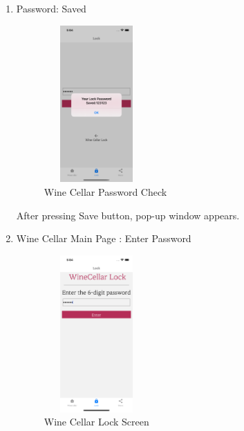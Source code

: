 \documentclass[sigconf, nonacm]{acmart}
\begin{document}
\begin {enumerate}
\begin{enumerate}
\begin{enumerate}
\begin{enumerate}
                \item Password: Saved\\
                \begin{figure}
                    \centering          
                    \includegraphics[width=4cm, height=6cm]{3. Winecellar AfterSetPasswd.png}
                    \caption{Wine Cellar Password Check}
                \end{figure}
                After pressing Save button, pop-up window appears. 
                 
                \item Wine Cellar Main Page : Enter Password
                \begin{figure}
                    \centering
                    \includegraphics[width=4cm, height=6cm]{4. Passwd Confirmation.png}
                    \caption{Wine Cellar Lock Screen}
                \end{figure}
                

\end{enumerate}
\end{enumerate}
\end{enumerate}
\end{enumerate}
\end{document}

